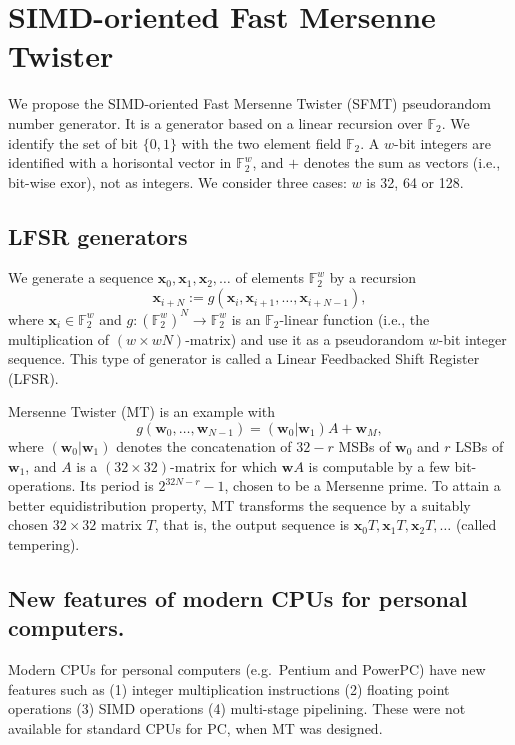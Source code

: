 \documentclass[acmnow]{acmtrans2m}
\def\F2{{\mathbb F}_2}
\def\bx{{{\mathbf x}}}
\def\bw{{{\mathbf w}}}
\begin{document}
\section{SIMD-oriented Fast Mersenne Twister}\label{sec:jump}

We propose the SIMD-oriented Fast Mersenne Twister (SFMT) 
pseudorandom number generator. It is a generator based
on a linear recursion over $\F2$. 
We identify
the set of bit $\{0,1\}$
with the two element field $\F2$.
A $w$-bit integers are identified with 
a horisontal vector in $\F2^{w}$, and 
$+$ denotes the sum as vectors (i.e., 
bit-wise exor), not as integers.
We consider three cases: $w$ is 32, 64 or 128.

\subsection{LFSR generators}
We generate
a sequence $\bx_0, \bx_1, \bx_2, \ldots$
of elements $\F2^{w}$ by a recursion
\begin{equation}\label{eq:recursion}
\bx_{i+N}:=g(\bx_i, \bx_{i+1}, \ldots, \bx_{i+N-1}),
\end{equation}
where $\bx_i \in \F2^{w}$ and 
$g:(\F2^{w})^N \to \F2^{w}$ is an $\F2$-linear function
(i.e., the multiplication of $(w \times wN)$-matrix)
and use it as a pseudorandom $w$-bit integer sequence.
This type of generator is called a Linear Feedbacked 
Shift Register (LFSR).

Mersenne Twister (MT) \cite{MT}
is an example with
$$
g(\bw_0,\ldots,\bw_{N-1})=(\bw_0|\bw_1)A + \bw_M,
$$
where $(\bw_0|\bw_1)$ denotes
the concatenation of 
$32-r$ MSBs of $\bw_0$ and $r$ LSBs of $\bw_1$,
and $A$ is a $(32\times 32)$-matrix 
for which $\bw A$ is computable 
by a few bit-operations.
Its period is $2^{32N-r}-1$, chosen to be a Mersenne prime.
To attain a better equidistribution property, 
MT transforms the sequence by
a suitably chosen $32\times 32$ matrix $T$, that is, 
the output sequence is 
$\bx_0T , \bx_1T, \bx_2T, \ldots$
(called tempering).

\subsection{New features of modern CPUs for personal computers.}
Modern CPUs for personal computers (e.g.\ Pentium and
PowerPC) have new features such as 
(1) integer multiplication instructions
(2) floating point operations 
(3) SIMD operations 
(4) multi-stage pipelining.
These were not available for standard CPUs for PC, when MT was designed.
\end{document}
